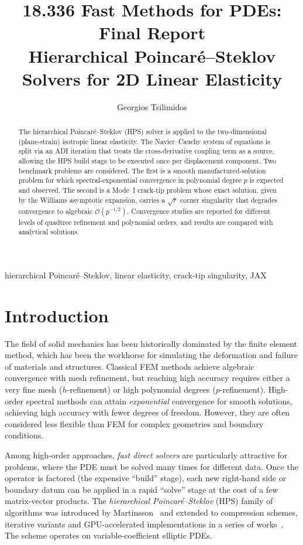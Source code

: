 \documentclass[hidelinks,onefignum,onetabnum]{siamart251216}
\title{18.336 Fast Methods for PDEs: Final Report\\
\large Hierarchical Poincar\'{e}--Steklov Solvers for 2D Linear Elasticity}
\author{Georgios Tsilimidos}
\begin{document}
\maketitle

\begin{abstract}
The hierarchical Poincar\'{e}--Steklov (HPS) solver is applied to the two-dimensional
(plane-strain) isotropic linear elasticity. The Navier--Cauchy system of equations
is split via an ADI iteration that treats the cross-derivative coupling term as a
source, allowing the HPS build stage to be executed once per displacement component.
Two benchmark problems are considered. The first is a smooth manufactured-solution problem for which
spectral-exponential convergence in polynomial degree $p$ is expected and observed.
The second is a Mode~I crack-tip problem whose exact solution, given
by the Williams asymptotic expansion, carries a $\sqrt{r}$ corner singularity
that degrades convergence to algebraic $\mathcal{O}(p^{-1/2})$.
Convergence studies are reported for different levels of quadtree refinement and
polynomial orders, and results are compared with analytical solutions.
\end{abstract}

\begin{keywords}
hierarchical Poincar\'{e}--Steklov, linear elasticity, crack-tip singularity, JAX
\end{keywords}

\section{Introduction}
\label{sec:intro}

The field of solid mechanics has been historically dominated by the finite element method,
which has been the workhorse for simulating the deformation and failure of materials and
structures. Classical FEM methods achieve algebraic convergence with mesh
refinement, but reaching high accuracy requires either a very fine mesh ($h$-refinement)
or high polynomial degrees ($p$-refinement).
High-order spectral methods can attain \emph{exponential} convergence for smooth
solutions, achieving high accuracy with fewer degrees of freedom. However, they are
often considered less flexible than FEM for complex geometries and boundary conditions.

Among high-order approaches, \emph{fast direct solvers} are particularly attractive
for problems, where the PDE must be solved many times for different data.
Once the operator is factored (the expensive ``build'' stage), each new right-hand
side or boundary datum can be applied in a rapid ``solve'' stage at the cost of
a few matrix-vector products.
The \emph{hierarchical Poincar\'{e}--Steklov} (HPS) family of algorithms was
introduced by Martinsson~\cite{Martinsson2013} and extended to compression schemes,
iterative variants and GPU-accelerated implementations in a series of
works~\cite{GillmanMartinsson2014,Gillman2015,melia2025}. The scheme operates on
variable-coefficient elliptic PDEs.
\end{document}
